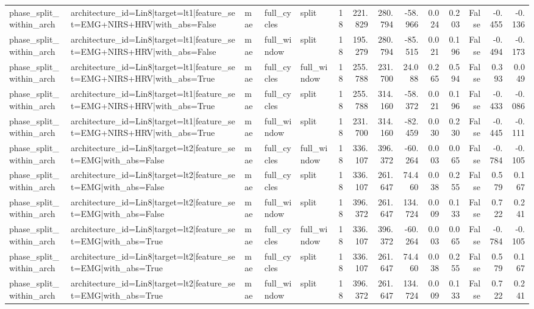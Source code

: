 \begin{table}
\begin{tabular}{lllllrrrrrrrrr}
phase_split_within_arch & architecture_id=Lin8|target=lt1|feature_set=EMG+NIRS+HRV|with_abs=False & mae & full_cycles & split & 18 & 221.829 & 280.794 & -58.966 & 0.024 & 0.203 & False & -0.455 & -0.136 \\
phase_split_within_arch & architecture_id=Lin8|target=lt1|feature_set=EMG+NIRS+HRV|with_abs=False & mae & full_window & split & 18 & 195.279 & 280.794 & -85.515 & 0.021 & 0.196 & False & -0.494 & -0.173 \\
phase_split_within_arch & architecture_id=Lin8|target=lt1|feature_set=EMG+NIRS+HRV|with_abs=True & mae & full_cycles & full_window & 18 & 255.788 & 231.700 & 24.088 & 0.265 & 0.594 & False & 0.393 & 0.049 \\
phase_split_within_arch & architecture_id=Lin8|target=lt1|feature_set=EMG+NIRS+HRV|with_abs=True & mae & full_cycles & split & 18 & 255.788 & 314.160 & -58.372 & 0.021 & 0.196 & False & -0.433 & -0.086 \\
phase_split_within_arch & architecture_id=Lin8|target=lt1|feature_set=EMG+NIRS+HRV|with_abs=True & mae & full_window & split & 18 & 231.700 & 314.160 & -82.459 & 0.030 & 0.230 & False & -0.445 & -0.111 \\
phase_split_within_arch & architecture_id=Lin8|target=lt2|feature_set=EMG|with_abs=False & mae & full_cycles & full_window & 18 & 336.107 & 396.372 & -60.264 & 0.003 & 0.065 & False & -0.784 & -0.105 \\
phase_split_within_arch & architecture_id=Lin8|target=lt2|feature_set=EMG|with_abs=False & mae & full_cycles & split & 18 & 336.107 & 261.647 & 74.460 & 0.038 & 0.255 & False & 0.579 & 0.167 \\
phase_split_within_arch & architecture_id=Lin8|target=lt2|feature_set=EMG|with_abs=False & mae & full_window & split & 18 & 396.372 & 261.647 & 134.724 & 0.009 & 0.133 & False & 0.722 & 0.241 \\
phase_split_within_arch & architecture_id=Lin8|target=lt2|feature_set=EMG|with_abs=True & mae & full_cycles & full_window & 18 & 336.107 & 396.372 & -60.264 & 0.003 & 0.065 & False & -0.784 & -0.105 \\
phase_split_within_arch & architecture_id=Lin8|target=lt2|feature_set=EMG|with_abs=True & mae & full_cycles & split & 18 & 336.107 & 261.647 & 74.460 & 0.038 & 0.255 & False & 0.579 & 0.167 \\
phase_split_within_arch & architecture_id=Lin8|target=lt2|feature_set=EMG|with_abs=True & mae & full_window & split & 18 & 396.372 & 261.647 & 134.724 & 0.009 & 0.133 & False & 0.722 & 0.241 \\

\end{tabular}
\end{table}
